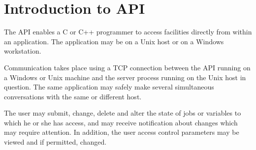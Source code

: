 \chapter{Introduction to \ProductName{} API}
\label{chp:introduction-to-xi-batch-api}
The \ProductName{} API enables a C or C++ programmer to access \ProductName{} facilities directly from within an application. The
application may be on a Unix host or on a Windows workstation.

Communication takes place using a TCP connection between the API running on a Windows or Unix machine and the server process
 running on the Unix host in question. The same application may safely make several simultaneous conversations
with the same or different host.

The user may submit, change, delete and alter the state of jobs or variables to which he or she has access, and may receive notification
about changes which may require attention. In addition, the user access control parameters may be viewed and if permitted, changed.


